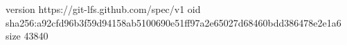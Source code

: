 version https://git-lfs.github.com/spec/v1
oid sha256:a92cfd96b3f59d94158ab5100690e51ff97a2e65027d68460bdd386478e2e1a6
size 43840
